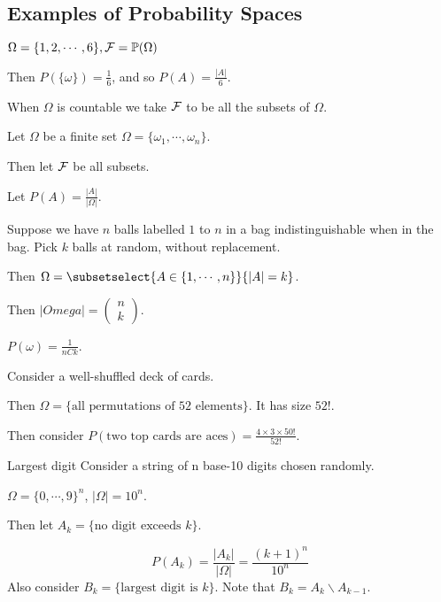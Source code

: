 \documentclass[../Main.tex]{subfiles}
\begin{document}
\subsection{Examples of Probability Spaces}
\begin{example}
    $\Omega = \{1, 2, \cdots, 6\}, \mathcal{F} = \mathbb{P}(\Omega)$\par %
        Then $P(\{\omega\}) = \frac{1}{6}$, and so $P(A) = \frac{|A|}{6}$.
\end{example}
\begin{remark}
    When $\Omega$ is countable we take $\mathcal{F}$ to be all the subsets of $\Omega$.
\end{remark}
\begin{example}
    Let $\Omega$ be a finite set $\Omega = \{\omega_1, \cdots, \omega_n\}$.\par
    Then let $\mathcal{F}$ be all subsets.\par
    Let $P(A) = \frac{|A|}{|\Omega|}$.
\end{example}
\begin{example}
    Suppose we have $n$ balls labelled $1$ to $n$ in a bag indistinguishable when in the bag. Pick $k$ balls at random, without replacement.\par
    Then $\Omega = \subsetselect{A \in \{1, \cdots, n\}}{|A| = k}$.\par
    Then $|Omega| = \begin{pmatrix}n \\ k\end{pmatrix}$.\par
    $P(\omega) = \frac{1}{nCk}$.
\end{example}
\begin{example}
    Consider a well-shuffled deck of cards.\par
    Then $\Omega = \{\text{all permutations of 52 elements}\}$. It has size $52!$.\par
    Then consider $P(\text{two top cards are aces}) = \frac{4 \times 3 \times 50!}{52!}$.
\end{example}
\begin{example}{Largest digit}
    Consider a string of n base-10 digits chosen randomly.\par
    $\Omega = \{0, \cdots, 9\}^n$, $|\Omega| = 10^n$.\par
    Then let $A_k=\{\text{no digit exceeds } k\}$.\par
    \begin{equation*}
        P(A_k) = \frac{|A_k|}{|\Omega|} = \frac{(k + 1)^n}{10^n}
    \end{equation*}
    Also consider $B_k = \{\text{largest digit is } k\}$. Note that $B_k = A_k \backslash A_{k - 1}$.
\end{example}
\end{document}

